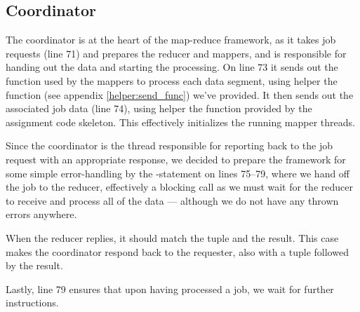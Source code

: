 \subsection{Coordinator}
\label{coordinator}
The coordinator is at the heart of the map-reduce framework, as it takes job
requests (line 71) and prepares the reducer and mappers, and is responsible
for handing out the data and starting the processing. On line 73 it sends out
the function used by the mappers to process each data segment, using helper
the function  (see appendix \ref{helper:send_func}) we've
provided. It then sends out the associated job data (line 74), using helper
the function  provided by the assignment code skeleton. This
effectively initializes the running mapper threads.

Since the coordinator is the thread responsible for reporting back to the job
request with an appropriate response, we decided to prepare the framework for
some simple error-handling by the -statement on lines 75--79, where
we hand off the job to the reducer, effectively a blocking call as we must
wait for the reducer to receive and process all of the data --- although we do
not have any thrown errors anywhere.


When the reducer replies, it should match the tuple  and the result.
This case makes the coordinator respond back to the requester, also with a
tuple  followed by the result.

Lastly, line 79 ensures that upon having processed a job, we wait for further
instructions.
